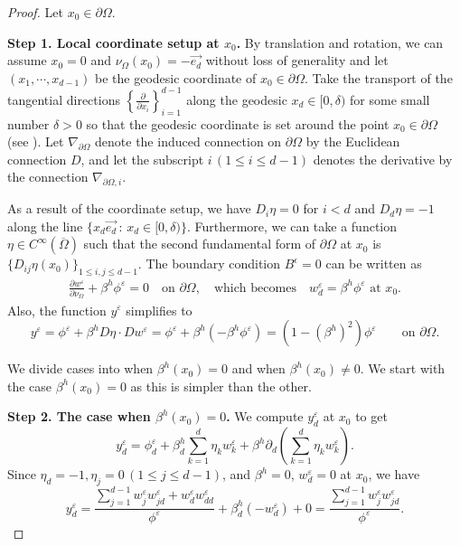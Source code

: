 \documentclass[11pt]{article}
\numberwithin{equation}{section}
\def\leq{\leqslant}
\begin{document}
\begin{proof}
Let $x_0\in\partial\Omega$.

\medskip

\textbf{Step 1. Local coordinate setup at $x_0$.} By translation and rotation, we can assume $x_0=0$ and $\nu_{\Omega}(x_0) = -\overrightarrow{e_d}$ without loss of generality and let $(x_1,\cdots,x_{d-1})$ be the geodesic coordinate of $x_0\in\partial\Omega$. Take the transport of the tangential directions $\left\{\frac{\partial}{\partial x_i}\right\}_{i=1}^{d-1}$ along the geodesic $x_d\in[0,\delta)$ for some small number $\delta>0$ so that the geodesic coordinate is set around the point $x_0\in\partial\Omega$ (see \cite{GT83}).  Let $\nabla_{\partial\Omega}$ denote the induced connection on $\partial\Omega$ by the Euclidean connection $D$, and let the subscript $i\,(1\leq i\leq d-1)$ denotes the derivative by the connection $\nabla_{\partial\Omega,i}$.

As a result of the coordinate setup, we have $D_i \eta = 0$ for $i < d$ and $D_d \eta = -1$ along the line $\{x_d\overrightarrow{e_d}\,:\,x_d\in[0,\delta)\}$. Furthermore, we can take a function $\eta\in C^{\infty}(\overline{\Omega})$ such that the second fundamental form of $\partial\Omega$ at $x_0$ is $\{D_{ij}\eta(x_0)\}_{1\leq i,j\leq d-1}$. The boundary condition $B^\epsilon = 0$ can be written as
\begin{align}\label{eq:BC-at-x0}
\frac{\partial w^\varepsilon}{\partial \nu_\Omega} + \beta^h \phi^\varepsilon = 0\quad\text{on $\partial\Omega$},\quad\text{which becomes}\quad w_d^{\varepsilon} = \beta^h \phi^\varepsilon\text{ at } x_0.
\end{align}
Also, the function $y^\varepsilon$ simplifies to
\[
y^\varepsilon = \phi^\varepsilon + \beta^h D\eta\cdot Dw^{\varepsilon} = \phi^{\varepsilon} + \beta^h (-\beta^h\phi^{\varepsilon}) = (1-(\beta^h)^2)\phi^{\varepsilon}\qquad\text{on $\partial\Omega$}.
\]

\medskip

We divide cases into when $\beta^h(x_0)=0$ and when $\beta^h(x_0)\neq0$. We start with the case $\beta^h(x_0)=0$ as this is simpler than the other.

\medskip

\textbf{Step 2. The case when $\beta^h(x_0)=0$.} %
We compute $y_d^{\varepsilon}$ at $x_0$ to get
\[
y^\varepsilon_d = \phi_d^\varepsilon + \beta^h_d \sum_{k=1}^d \eta_k w^\varepsilon_k + \beta^h \partial_d \left(\sum_{k=1}^d \eta_k w^\varepsilon_k\right).
\]
Since $\eta_d = -1, \eta_j = 0\, (1\leq j\leq d-1)$, and $\beta^h=0$,
$w^\varepsilon_d=0$ at $x_0$, we have
\[
y^\varepsilon_d = \frac{\sum_{j=1}^{d-1}
w^\varepsilon_j w^\varepsilon_{jd} + w^\varepsilon_d
w^\varepsilon_{dd}}{\phi^\varepsilon} + \beta^h_d (-w^\varepsilon_d) + 0 =
\frac{\sum_{j=1}^{d-1} w^\varepsilon_j w^\varepsilon_{jd}}{\phi^\varepsilon}.
\]


\end{proof}
\end{document}
